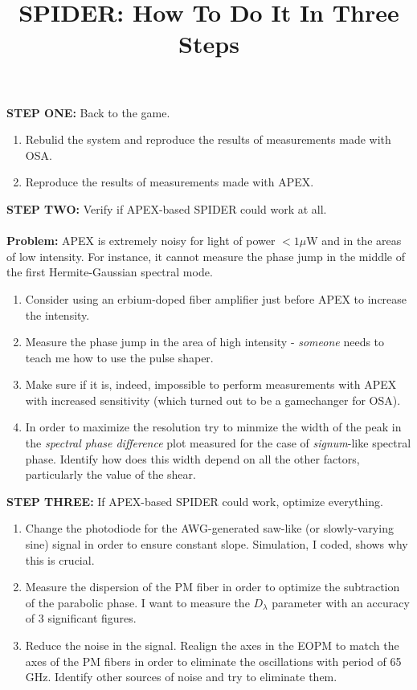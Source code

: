 \documentclass{article}
\begin{document}
\title{SPIDER: How To Do It In Three Steps}
\maketitle
\thispagestyle{empty}
\noindent
\textbf{STEP ONE:} Back to the game.
\begin{enumerate}
	\item Rebulid the system and reproduce the results of measurements made with OSA.
	\item Reproduce the results of measurements made with APEX.
\end{enumerate}
\textbf{STEP TWO:} Verify if APEX-based SPIDER could work at all.\\ \\
\textbf{Problem:} APEX is extremely noisy for light of power $<1\mu$W and in the areas of low intensity. For instance, it cannot measure the phase jump in the middle of the first Hermite-Gaussian spectral mode.
\begin{enumerate}
	\item Consider using an erbium-doped fiber amplifier just before APEX to increase the intensity.
	\item Measure the phase jump in the area of high intensity - \emph{someone} needs to teach me how to use the pulse shaper.
	\item Make sure if it is, indeed, impossible to perform measurements with APEX with increased sensitivity (which turned out to be a gamechanger for OSA).
	\item In order to maximize the resolution try to minmize the width of the peak in the \emph{spectral phase difference} plot measured for the case of \emph{signum}-like spectral phase. Identify how does this width depend on all the other factors, particularly the value of the shear.

\end{enumerate}
\textbf{STEP THREE:} If APEX-based SPIDER could work, optimize everything.
\begin{enumerate}
	\item Change the photodiode for the AWG-generated saw-like (or slowly-varying sine) signal in order to ensure constant slope. Simulation, I coded, shows why this is crucial.
	\item Measure the dispersion of the PM fiber in order to optimize the subtraction of the parabolic phase. I want to measure the $D_\lambda$ parameter with an accuracy of 3 significant figures.
	\item Reduce the noise in the signal. Realign the axes in the EOPM to match the axes of the PM fibers in order to eliminate the oscillations with period of 65 GHz. Identify other sources of noise and try to eliminate them.
\end{enumerate}
\end{document}
